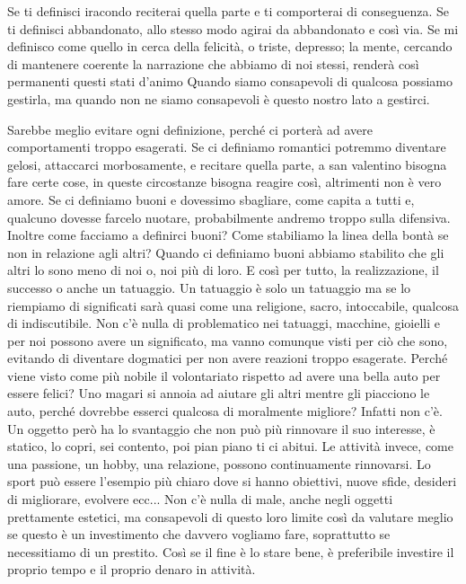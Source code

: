 \documentclass[12pt]{book} %
\begin{document}
Se ti definisci iracondo reciterai quella parte e ti
comporterai di conseguenza. Se ti definisci abbandonato, allo stesso modo agirai da abbandonato e così via. 
Se mi definisco come quello in cerca della felicità, o triste, depresso; la mente, cercando di mantenere coerente la narrazione che abbiamo di noi stessi, renderà così permanenti questi stati d'animo
Quando siamo consapevoli di qualcosa possiamo gestirla, ma quando non ne siamo consapevoli è questo nostro lato a gestirci.

Sarebbe meglio evitare ogni definizione, perché ci porterà ad avere comportamenti troppo esagerati.
Se ci definiamo romantici potremmo diventare gelosi, attaccarci morbosamente, e recitare quella parte, a san valentino bisogna fare certe cose, in queste circostanze bisogna reagire così, altrimenti non è vero amore. Se ci definiamo buoni e dovessimo sbagliare, come capita a tutti e, qualcuno dovesse farcelo nuotare, probabilmente andremo troppo sulla difensiva. 
Inoltre come facciamo a definirci buoni? Come stabiliamo la linea della bontà se non in relazione agli altri? Quando ci definiamo buoni abbiamo stabilito che gli altri lo sono meno di noi o, noi più di loro. E così per tutto, la realizzazione, il successo o anche un tatuaggio. Un tatuaggio è solo un tatuaggio ma se lo riempiamo di significati sarà quasi come una religione, sacro, intoccabile, qualcosa di indiscutibile. Non c'è nulla di problematico nei tatuaggi, macchine, gioielli e per noi possono avere un significato, ma vanno comunque visti per ciò che sono, evitando di diventare dogmatici per non avere reazioni troppo esagerate.
Perché viene visto come più nobile il volontariato rispetto ad avere una bella auto per essere felici? Uno magari si annoia ad aiutare gli altri mentre gli piacciono le auto, perché dovrebbe esserci qualcosa di moralmente migliore? Infatti non c'è.
Un oggetto però ha lo svantaggio che non può più rinnovare il suo interesse, è statico, lo copri, sei contento, poi pian piano ti ci abitui. Le attività invece, come una passione, un hobby, una relazione, possono continuamente rinnovarsi. Lo sport può essere l'esempio più chiaro dove si hanno obiettivi, nuove sfide, desideri di migliorare, evolvere ecc... Non c'è nulla di male, anche negli oggetti prettamente estetici, ma consapevoli di questo loro limite così da valutare meglio se questo è un investimento che davvero vogliamo fare, soprattutto se necessitiamo di un prestito. Così se il fine è lo stare bene, è preferibile investire il proprio tempo e il proprio denaro in attività.
\end{document}
